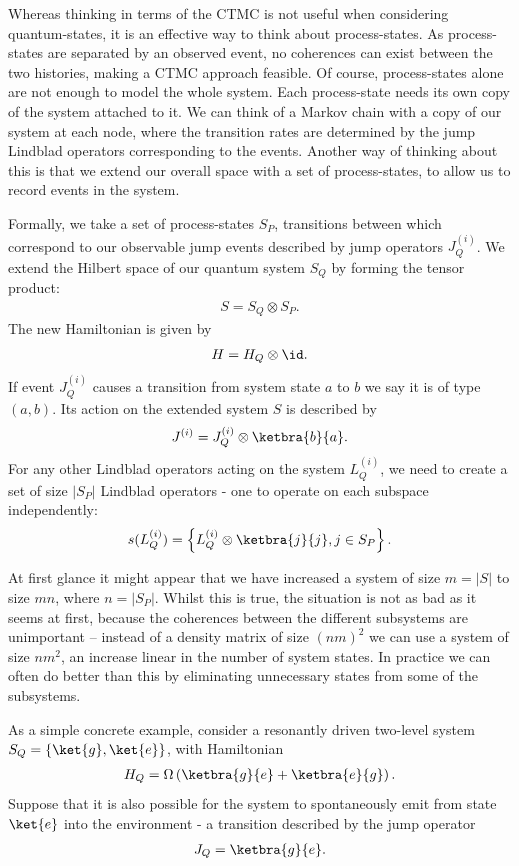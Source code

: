Whereas thinking in terms of the CTMC is not useful when considering quantum-states, it is an effective way to think about process-states. As process-states are separated by an observed event, no coherences can exist between the two histories, making a CTMC approach feasible. Of course, process-states alone are not enough to model the whole system. Each process-state needs its own copy of the system attached to it. We can think of a Markov chain with a copy of our system at each node, where the transition rates are determined by the jump Lindblad operators corresponding to the events. Another way of thinking about this is that we extend our overall space with a set of process-states, to allow us to record events in the system.

Formally, we take a set of process-states $S_P$, transitions between which correspond to our observable jump events described by jump operators $J_Q^{(i)}$. We extend the Hilbert space of our quantum system $S_Q$ by forming the tensor product:
\begin{eqnarray}
  S = S_Q \otimes S_P.
\end{eqnarray}
The new Hamiltonian is given by
\begin{eqnarray}
  H = H_Q \otimes \id.
\end{eqnarray}
If event $J_Q^{(i)}$ causes a transition from system state $a$ to $b$ we say it is of type $(a, b)$. Its action on the extended system $S$ is described by
\begin{eqnarray}
J^{(i)} = J_Q^{(i)} \otimes \ketbra{b}{a}.
\end{eqnarray}
For any other Lindblad operators acting on the system $L_Q^{(i)}$, we need to create a set of size $|S_P|$ Lindblad operators - one to operate on each subspace independently:
\begin{eqnarray}
  s(L_Q^{(i)}) = \left\{ L_Q^{(i)} \otimes \ketbra{j}{j}, j \in S_P \right\}.
\end{eqnarray}

At first glance it might appear that we have increased a system of size $m = |S|$ to size $mn$, where $n = |S_P|$. Whilst this is true, the situation is not as bad as it seems at first, because the coherences between the different subsystems are unimportant -- instead of a density matrix of size $(nm)^2$ we can use a system of size $nm^2$, an increase linear in the number of system states. In practice we can often do better than this by eliminating unnecessary states from some of the subsystems.  

As a simple concrete example, consider a resonantly driven two-level system $S_Q = \{ \ket{g}, \ket{e} \}$, with Hamiltonian
\begin{eqnarray}
  H_Q = \Omega \left( \ketbra{g}{e} + \ketbra{e}{g} \right).
\end{eqnarray}
Suppose that it is also possible for the system to spontaneously emit from state $\ket{e}$ into the environment - a transition described by the jump operator
\begin{eqnarray}
  J_Q = \ketbra{g}{e}.
\end{eqnarray}


